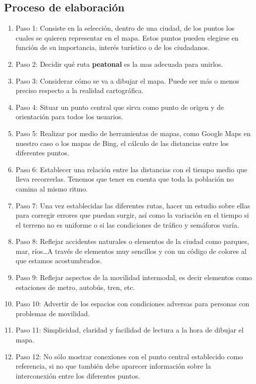 \subsection{Proceso de elaboración}
\begin{enumerate}
	\item Paso 1: Consiste en la selección, dentro de una ciudad, de los puntos los cuales se quieren representar en el mapa. Estos puntos pueden elegirse en función de su importancia, interés turístico o de los ciudadanos.
	\item Paso 2: Decidir qué ruta \textbf{peatonal} es la mas adecuada para unirlos.
	\item Paso 3: Considerar cómo se va a dibujar el mapa. Puede ser más o menos preciso respecto a la realidad cartográfica.
	\item Paso 4: Situar un punto central que sirva como punto de origen y de orientación para todos los usuarios.
	\item Paso 5: Realizar por medio de herramientas de mapas, como Google Maps en nuestro caso o los mapas de Bing, el cálculo de las distancias entre los diferentes puntos.
	\item Paso 6: Establecer una relación entre las distancias con el tiempo medio que lleva recorrerlas. Tenemos que tener en cuenta que toda la población no camina al mismo ritmo.
	\item Paso 7: Una vez establecidas las diferentes rutas, hacer un estudio sobre ellas para corregir errores que puedan surgir, así como la variación en el tiempo si el terreno no es uniforme o si las condiciones de tráfico y semáforos varía.
	\item Paso 8: Reflejar accidentes naturales o elementos de la ciudad como parques, mar, ríos\dots A través de elementos muy sencillos y con un código de colores al que estamos acostumbrados.
	\item Paso 9:  Reflejar aspectos de la movilidad intermodal, es decir elementos como estaciones de metro, autobús, tren, etc. 
	\item Paso 10: Advertir de los espacios con condiciones adversas para personas con problemas de movilidad.
	\item Paso 11: Simplicidad, claridad y facilidad de lectura a la hora de dibujar el mapa.
	\item Paso 12: No sólo mostrar conexiones con el punto central establecido como referencia, si no que también debe aparecer información sobre la interconexión entre los diferentes puntos.
\end{enumerate}

